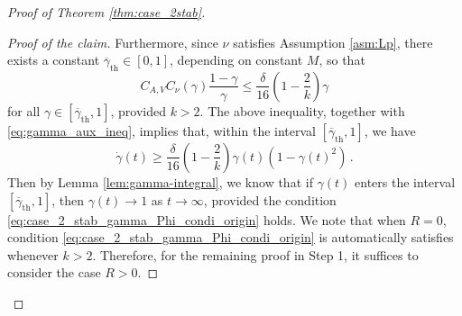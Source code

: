 \documentclass[10pt]{article}
\theoremstyle{definition}
\theoremstyle{definition}
\numberwithin{equation}{section}
\newcommand{\Dgamma}{\Dot{\gamma}}
\newcommand{\gammaTH}{\gamma_{\mathrm{th}}}
\newcommand{\BargammaTH}{\overline{\gamma}_{\mathrm{th}}}
\begin{document}
\begin{proof}[Proof of Theorem \ref{thm:case_2stab}]
\begin{proof}[Proof of the claim]
Furthermore, since $\nu$ satisfies Assumption \ref{asm:Lp}, there exists a constant $\BargammaTH \in [0,1]$, depending on constant $M$, so that
\begin{equation*}
C_{A,V} C_{\nu}(\gamma) \frac{1 - \gamma}{\gamma} \leq \frac{\delta}{16} \left(1 - \frac{2}{k} \right) \gamma 
\end{equation*}
for all $\gamma \in [\BargammaTH, 1]$, provided $k > 2$.
The above inequality, together with \eqref{eq:gamma_aux_ineq}, implies that, within the interval $[\BargammaTH, 1]$, we have
\begin{equation}\label{eq:gamma_growth_ineq}
\Dgamma (t) \geq \frac{\delta}{16} \left( 1 - \frac{2}{k} \right) \gamma(t) (1 - \gamma(t)^2) \, .
\end{equation}
Then by Lemma \ref{lem:gamma-integral}, we know that if $\gamma(t)$ enters the interval $[\BargammaTH,1]$, then $\gamma(t) \rightarrow 1$ as $t \rightarrow \infty$, provided the condition \eqref{eq:case_2_stab_gamma_Phi_condi_origin} holds.
We note that when $R = 0$, condition \eqref{eq:case_2_stab_gamma_Phi_condi_origin} is automatically satisfies whenever $k > 2$.
Therefore, for the remaining proof in Step 1, it suffices to consider the case $R > 0$.


\end{proof}
\end{proof}
\end{document}
